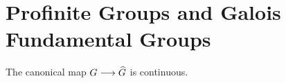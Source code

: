 \chapter{Profinite Groups and Galois Fundamental Groups}
\label{appendix:profinite}

\begin{prop}\label{prop:compl_is_cont}
The canonical map $G \longrightarrow \widehat{G}$ is continuous.
\end{prop}
